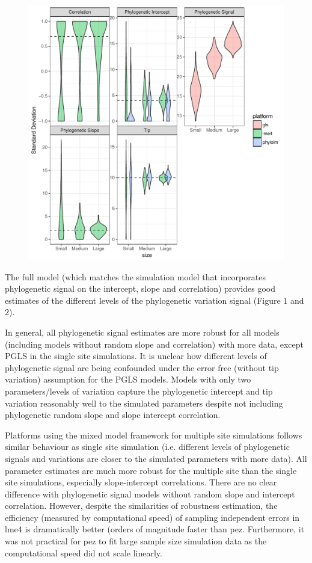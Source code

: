 \begin{center}
\begin{figure}[h]
\includegraphics[scale=0.8,page=1]{./git_push/ssplot.pdf}
\label{ssplot}
\end{figure}
\end{center}

The full model (which matches the simulation model that incorporates phylogenetic signal on the intercept, slope and correlation) provides good estimates of the different levels of the phylogenetic variation signal (Figure 1 and 2).

In general, all phylogenetic signal estimates are more robust for all models (including models without random slope and correlation) with more data, except PGLS in the single site simulations. 
It is unclear how different levels of phylogenetic signal are being confounded under the error free (without tip variation) assumption for the PGLS models.
Models with only two parameters/levels of variation capture the phylogenetic intercept and tip variation reasonably well to the simulated parameters despite not including phylogenetic random slope and slope intercept correlation.

Platforms using the mixed model framework for multiple site simulations follows similar behaviour as single site simulation (i.e. different levels of phylogenetic signals and variations are closer to the simulated parameters with more data). 
All parameter estimates are much more robust for the multiple site than the single site simulations, especially slope-intercept correlations. 
There are no clear difference with phylogenetic signal models without random slope and intercept correlation.
However, despite the similarities of robustness estimation, the efficiency (measured by computational speed) of sampling independent errors in lme4 is dramatically better (orders of magnitude faster than pez.
Furthermore, it was not practical for pez to fit large sample size simulation data as the computational speed did not scale linearly.

